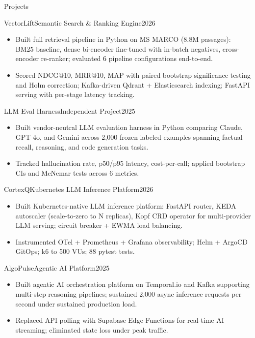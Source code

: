 \documentclass[]{mcdowellcv}
\begin{document}
\begin{cvsection}{Projects}
  \begin{cvsubsection}{VectorLift}{Semantic Search \& Ranking Engine}{2026}
    \begin{itemize}
      \item Built full retrieval pipeline in Python on MS MARCO (8.8M passages): BM25 baseline, dense bi-encoder fine-tuned with in-batch negatives, cross-encoder re-ranker; evaluated 6 pipeline configurations end-to-end.
      \item Scored NDCG@10, MRR@10, MAP with paired bootstrap significance testing and Holm correction; Kafka-driven Qdrant + Elasticsearch indexing; FastAPI serving with per-stage latency tracking.
    \end{itemize}
    \vspace{-1.5pt}
  \end{cvsubsection}

  \begin{cvsubsection}{LLM Eval Harness}{Independent Project}{2025}
    \begin{itemize}
      \item Built vendor-neutral LLM evaluation harness in Python comparing Claude, GPT-4o, and Gemini across 2,000 frozen labeled examples spanning factual recall, reasoning, and code generation tasks.
      \item Tracked hallucination rate, p50/p95 latency, cost-per-call; applied bootstrap CIs and McNemar tests across 6 metrics.
    \end{itemize}
    \vspace{-1.5pt}
  \end{cvsubsection}

  \begin{cvsubsection}{CortexQ}{Kubernetes LLM Inference Platform}{2026}
    \begin{itemize}
      \item Built Kubernetes-native LLM inference platform: FastAPI router, KEDA autoscaler (scale-to-zero to N replicas), Kopf CRD operator for multi-provider LLM serving; circuit breaker + EWMA load balancing.
      \item Instrumented OTel + Prometheus + Grafana observability; Helm + ArgoCD GitOps; k6 to 500 VUs; 88 pytest tests.
    \end{itemize}
    \vspace{-1.5pt}
  \end{cvsubsection}

  \begin{cvsubsection}{AlgoPulse}{Agentic AI Platform}{2025}
    \begin{itemize}
      \item Built agentic AI orchestration platform on Temporal.io and Kafka supporting multi-step reasoning pipelines; sustained 2,000 async inference requests per second under sustained production load.
      \item Replaced API polling with Supabase Edge Functions for real-time AI streaming; eliminated state loss under peak traffic.
    \end{itemize}
  \end{cvsubsection}
\end{cvsection}
\end{document}
